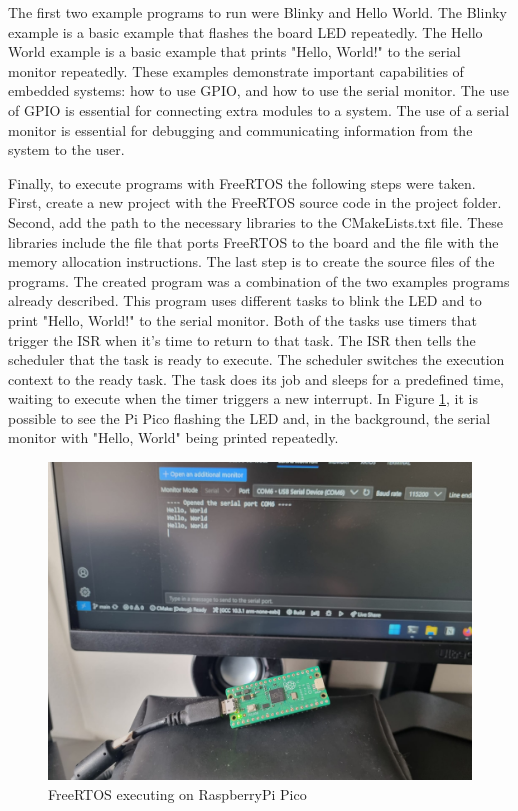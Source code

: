 The first two example programs to run were Blinky and Hello World. The Blinky example is a basic example that flashes the board LED repeatedly. The Hello World example is a basic example that prints "Hello, World!" to the serial monitor repeatedly. These examples demonstrate important capabilities of embedded systems: how to use GPIO, and how to use the serial monitor. The use of GPIO is essential for connecting extra modules to a system. The use of a serial monitor is essential for debugging and communicating information from the system to the user.

Finally, to execute programs with FreeRTOS the following steps were taken. First, create a new project with the FreeRTOS source code in the project folder. Second, add the path to the necessary libraries to the CMakeLists.txt file. These libraries include the file that ports FreeRTOS to the board and the file with the memory allocation instructions. The last step is to create the source files of the programs. The created program was a combination of the two examples programs already described. This program uses different tasks to blink the LED and to print "Hello, World!" to the serial monitor. Both of the tasks use timers that trigger the ISR when it's time to return to that task. The ISR then tells the scheduler that the task is ready to execute. The scheduler switches the execution context to the ready task. The task does its job and sleeps for a predefined time, waiting to execute when the timer triggers a new interrupt. In Figure \ref{fig:pico}, it is possible to see the Pi Pico flashing the LED and, in the background, the serial monitor with "Hello, World" being printed repeatedly.

\begin{figure}[h]
    \centering
    \includegraphics[scale=0.15]{Figures/pico-multitasking.jpeg}
    \caption{FreeRTOS executing on RaspberryPi Pico}
    \label{fig:pico}
\end{figure}


